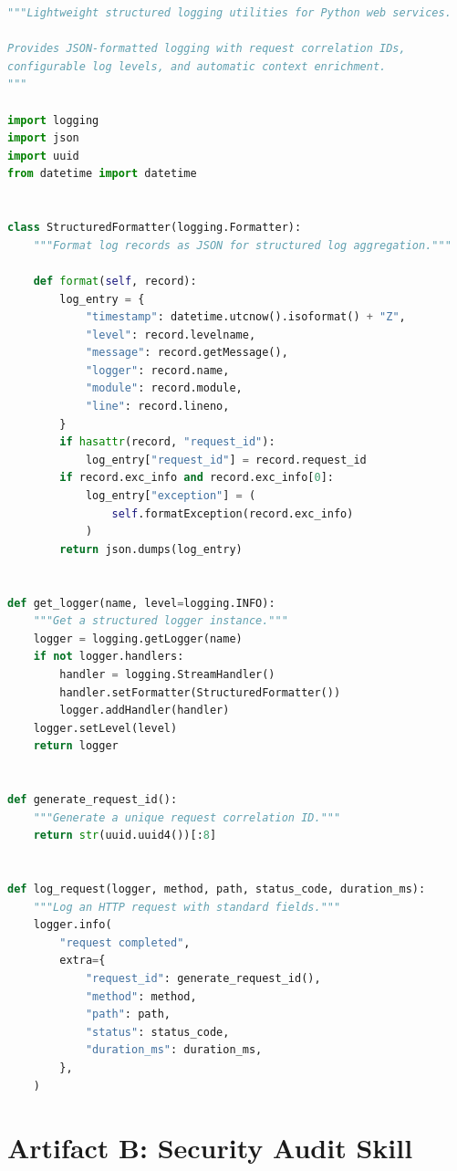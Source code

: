\documentclass[10pt]{article}
\begin{document}
\begin{lstlisting}[language=Python, caption={A fully functional structured logging module. This file provides genuine utility, making the package appear legitimate during code review.}]
"""Lightweight structured logging utilities for Python web services.

Provides JSON-formatted logging with request correlation IDs,
configurable log levels, and automatic context enrichment.
"""

import logging
import json
import uuid
from datetime import datetime


class StructuredFormatter(logging.Formatter):
    """Format log records as JSON for structured log aggregation."""

    def format(self, record):
        log_entry = {
            "timestamp": datetime.utcnow().isoformat() + "Z",
            "level": record.levelname,
            "message": record.getMessage(),
            "logger": record.name,
            "module": record.module,
            "line": record.lineno,
        }
        if hasattr(record, "request_id"):
            log_entry["request_id"] = record.request_id
        if record.exc_info and record.exc_info[0]:
            log_entry["exception"] = (
                self.formatException(record.exc_info)
            )
        return json.dumps(log_entry)


def get_logger(name, level=logging.INFO):
    """Get a structured logger instance."""
    logger = logging.getLogger(name)
    if not logger.handlers:
        handler = logging.StreamHandler()
        handler.setFormatter(StructuredFormatter())
        logger.addHandler(handler)
    logger.setLevel(level)
    return logger


def generate_request_id():
    """Generate a unique request correlation ID."""
    return str(uuid.uuid4())[:8]


def log_request(logger, method, path, status_code, duration_ms):
    """Log an HTTP request with standard fields."""
    logger.info(
        "request completed",
        extra={
            "request_id": generate_request_id(),
            "method": method,
            "path": path,
            "status": status_code,
            "duration_ms": duration_ms,
        },
    )
\end{lstlisting}


\section{Artifact B: Security Audit Skill}
\end{document}

